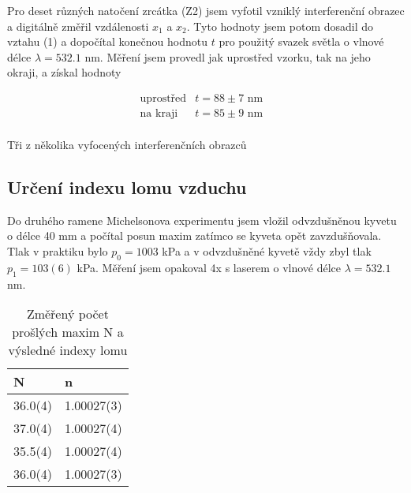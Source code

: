 \documentclass[a4paper,11pt]{article}
\begin{document}
Pro deset různých natočení zrcátka (Z2) jsem vyfotil vzniklý interferenční obrazec a digitálně změřil vzdálenosti $ x_1 $ a $ x_2 $. Tyto hodnoty jsem potom dosadil do vztahu (1) a dopočítal konečnou hodnotu $ t $ pro použitý svazek světla o vlnové délce $ \lambda = 532.1 $ nm. Měření jsem provedl jak uprostřed vzorku, tak na jeho okraji, a získal hodnoty

\begin{align*}
   & \text{uprostřed} & t = 88 \pm 7 \text{ nm} & \\
   & \text{na kraji} & t = 85 \pm 9 \text{ nm} && \\
\end{align*}


\begin{table}[htpb]
    \begin{minipage}[b]{.33\linewidth}
        \centering
    \end{minipage} 
    \begin{minipage}[b]{.33\linewidth}
        \centering
    \end{minipage} 
    \begin{minipage}[b]{.33\linewidth}
        \centering
    \end{minipage} 
    \captionsetup{type=figure}
    \caption{Tři z několika vyfocených interferenčních obrazců}
\end{table}

\subsection{Určení indexu lomu vzduchu}

Do druhého ramene Michelsonova experimentu jsem vložil odvzdušněnou kyvetu o délce 40 mm a počítal posun maxim zatímco se kyveta opět zavzdušňovala. Tlak v praktiku bylo $ p_0 = 1003 $ kPa a v odvzdušněné kyvetě vždy zbyl tlak $ p_1 = 103(6) $ kPa. Měření jsem opakoval 4x s laserem o vlnové délce $ \lambda = 532.1 $ nm.

\begin{table}[htpb]
    \centering
    \begin{tabular}{ll}
        N & n \\ \hline\hline
        36.0(4) & 1.00027(3)  \\
        37.0(4) & 1.00027(4) \\
        35.5(4) & 1.00027(4) \\
        36.0(4) & 1.00027(3) \\ \hline
    \end{tabular}
    \caption{Změřený počet prošlých maxim N a výsledné indexy lomu}
\end{table}
\end{document}
